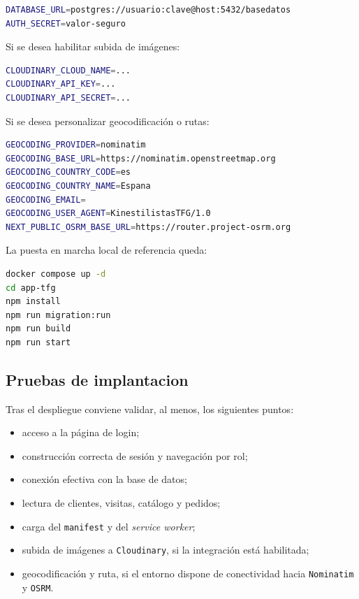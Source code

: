 \begin{lstlisting}[language=bash]
DATABASE_URL=postgres://usuario:clave@host:5432/basedatos
AUTH_SECRET=valor-seguro
\end{lstlisting}

Si se desea habilitar subida de imágenes:

\begin{lstlisting}[language=bash]
CLOUDINARY_CLOUD_NAME=...
CLOUDINARY_API_KEY=...
CLOUDINARY_API_SECRET=...
\end{lstlisting}

Si se desea personalizar geocodificación o rutas:

\begin{lstlisting}[language=bash]
GEOCODING_PROVIDER=nominatim
GEOCODING_BASE_URL=https://nominatim.openstreetmap.org
GEOCODING_COUNTRY_CODE=es
GEOCODING_COUNTRY_NAME=Espana
GEOCODING_EMAIL=
GEOCODING_USER_AGENT=KinestilistasTFG/1.0
NEXT_PUBLIC_OSRM_BASE_URL=https://router.project-osrm.org
\end{lstlisting}

La puesta en marcha local de referencia queda:

\begin{lstlisting}[language=bash]
docker compose up -d
cd app-tfg
npm install
npm run migration:run
npm run build
npm run start
\end{lstlisting}

\subsection{Pruebas de implantacion}

Tras el despliegue conviene validar, al menos, los siguientes puntos:

\begin{itemize}
    \item acceso a la página de login;
    \item construcción correcta de sesión y navegación por rol;
    \item conexión efectiva con la base de datos;
    \item lectura de clientes, visitas, catálogo y pedidos;
    \item carga del \texttt{manifest} y del \textit{service worker};
    \item subida de imágenes a \texttt{Cloudinary}, si la integración está habilitada;
    \item geocodificación y ruta, si el entorno dispone de conectividad hacia \texttt{Nominatim} y \texttt{OSRM}.
\end{itemize}

